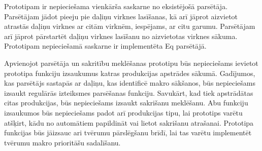 Prototipam ir nepieciešama vienkārša saskarne no eksistējošā parsētāja. Parsētājam jādot pieeju pie daļiņu virknes lasīšanas, kā arī jāprot aizvietot atrastās daļiņu virknes ar citām virknēm, iespējams, ar citu garumu. Parsētājam arī jāprot pārstartēt daļiņu virknes lasīšanu no aizvietotas virknes sākuma. Prototipam nepieciešamā saskarne ir implementēta Eq parsētājā.

Apvienojot parsētāja un sakritību meklēšanas prototipu būs nepieciešams ievietot prototipa funkciju izsaukumus katras produkcijas apstrādes sākumā. Gadījumos, kas parsētājs sastapās ar daļiņu, kas identificē makro sākšanos, būs nepieciešams izsaukt regulārās izteiksmes parsēšanas funkciju. Savukārt, kad tiek apstrādātas citas produkcijas, būs nepieciešams izsaukt sakrišanu meklēšanu. Abu funkciju izsaukumos būs nepieciešams padot arī produkcijas tipu, lai prototips varētu atšķirt, kādu no automātiem papildināt vai lietot sakrišanu atrašanai. Prototipa funkcijas būs jāizsauc ari tvērumu pārslēgšanu brīdī, lai tas varētu implementēt tvērumu makro prioritāšu sadalīšanu.